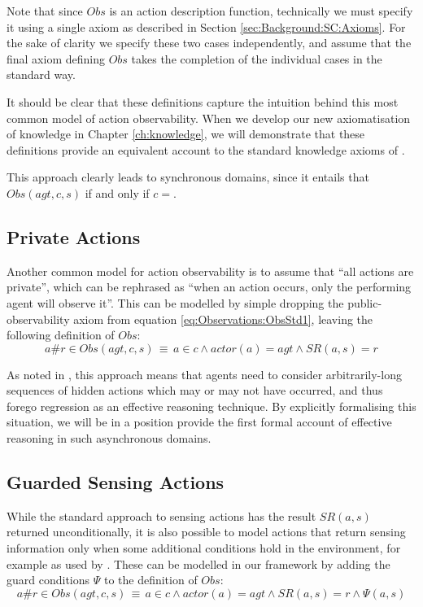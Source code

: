Note that since $Obs$ is an action description function, technically
we must specify it using a single axiom as described in Section \ref{sec:Background:SC:Axioms}.
For the sake of clarity we specify these two cases independently,
and assume that the final axiom defining $Obs$ takes the completion
of the individual cases in the standard way.

It should be clear that these definitions capture the intuition behind
this most common model of action observability. When we develop our
new axiomatisation of knowledge in Chapter \ref{ch:knowledge}, we
will demonstrate that these definitions provide an equivalent account
to the standard knowledge axioms of \citet{scherl03sc_knowledge}.

This approach clearly leads to synchronous domains, since it entails that
$Obs(agt,c,s)$ if and only if $c={}$.


\subsection{Private Actions}

Another common model for action observability is to assume that {}``all
actions are private'', which can be rephrased as {}``when an action
occurs, only the performing agent will observe it''. This can be
modelled by simple dropping the public-observability axiom from equation
\ref{eq:Observations:ObsStd1}, leaving the following definition of
$Obs$:\[
a\#r\in Obs(agt,c,s)\,\equiv\, a\in c\wedge actor(a)=agt\wedge SR(a,s)=r\]


As noted in \citep{Lesperance99sitcalc_approach}, this approach means
that agents need to consider arbitrarily-long sequences of hidden
actions which may or may not have occurred, and thus forego regression
as an effective reasoning technique. By explicitly formalising this
situation, we will be in a position provide the first formal account
of effective reasoning in such asynchronous domains.


\subsection{Guarded Sensing Actions\label{sec:Observations:Guarded-Sensing}}

While the standard approach to sensing actions has the result $SR(a,s)$
returned unconditionally, it is also possible to model actions that
return sensing information only when some additional conditions hold
in the environment, for example as used by \citet{Petrick06thesis}.
These can be modelled in our framework by adding the guard conditions
$\Psi$ to the definition of $Obs$:\[
a\#r\in Obs(agt,c,s)\,\equiv\, a\in c\wedge actor(a)=agt\wedge SR(a,s)=r\wedge\Psi(a,s)\]


